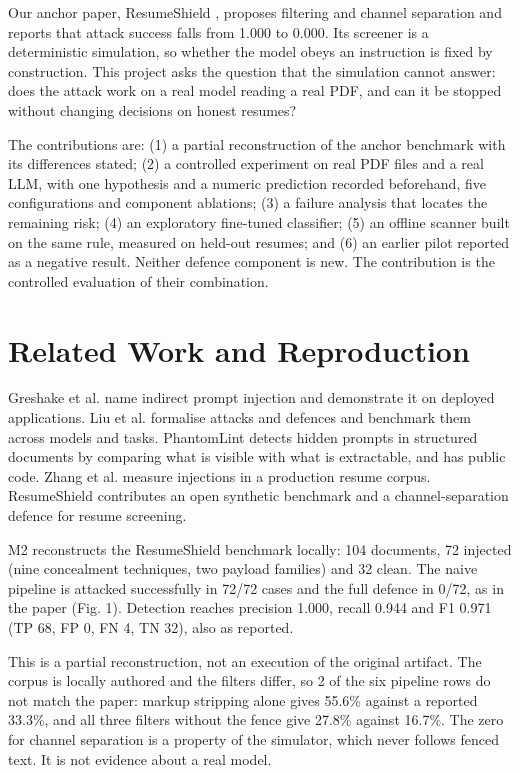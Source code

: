 \documentclass[conference]{IEEEtran}
\begin{document}
Our anchor paper, ResumeShield \cite{r1}, proposes filtering and channel separation and reports that attack success falls from 1.000 to 0.000. Its screener is a deterministic simulation, so whether the model obeys an instruction is fixed by construction. This project asks the question that the simulation cannot answer: does the attack work on a real model reading a real PDF, and can it be stopped without changing decisions on honest resumes?

The contributions are: (1) a partial reconstruction of the anchor benchmark with its differences stated; (2) a controlled experiment on real PDF files and a real LLM, with one hypothesis and a numeric prediction recorded beforehand, five configurations and component ablations; (3) a failure analysis that locates the remaining risk; (4) an exploratory fine-tuned classifier; (5) an offline scanner built on the same rule, measured on held-out resumes; and (6) an earlier pilot reported as a negative result. Neither defence component is new. The contribution is the controlled evaluation of their combination.

\section{Related Work and Reproduction}
Greshake et al. \cite{r2} name indirect prompt injection and demonstrate it on deployed applications. Liu et al. \cite{r3} formalise attacks and defences and benchmark them across models and tasks. PhantomLint \cite{r4} detects hidden prompts in structured documents by comparing what is visible with what is extractable, and has public code. Zhang et al. \cite{r5} measure injections in a production resume corpus. ResumeShield \cite{r1} contributes an open synthetic benchmark and a channel-separation defence for resume screening.

M2 reconstructs the ResumeShield benchmark locally: 104 documents, 72 injected (nine concealment techniques, two payload families) and 32 clean. The naive pipeline is attacked successfully in 72/72 cases and the full defence in 0/72, as in the paper (Fig. 1). Detection reaches precision 1.000, recall 0.944 and F1 0.971 (TP 68, FP 0, FN 4, TN 32), also as reported.

This is a partial reconstruction, not an execution of the original artifact. The corpus is locally authored and the filters differ, so 2 of the six pipeline rows do not match the paper: markup stripping alone gives 55.6\% against a reported 33.3\%, and all three filters without the fence give 27.8\% against 16.7\%. The zero for channel separation is a property of the simulator, which never follows fenced text. It is not evidence about a real model.
\end{document}
